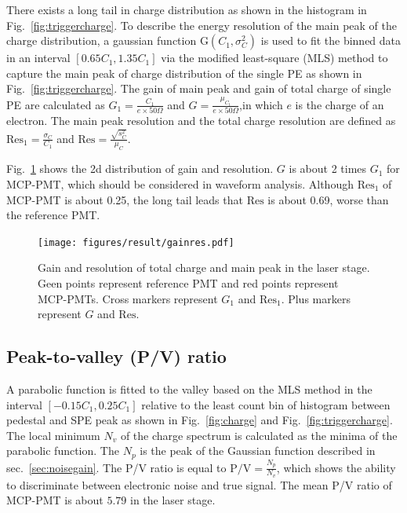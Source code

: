 There exists a long tail in charge distribution as shown in the histogram in Fig.~\ref{fig:triggercharge}. To describe the energy resolution of the main peak of the charge distribution, a gaussian function G$(C_1,\sigma^2_{C})$ is used to fit the binned data in an interval $[0.65C_1, 1.35C_1]$ via the modified least-square (MLS) method \cite{Cowan1998StatisticalDA} to capture the main peak of charge distribution of the single PE as shown in Fig.~\ref{fig:triggercharge}. The gain of main peak and gain of total charge of single PE are calculated as $G_1=\frac{C_1}{e\times 50\Omega}$ and $G= \frac{\mu_{C_t}}{e\times 50\Omega}$,in which $e$ is the charge of an electron. The main peak resolution and the total charge resolution are defined as $\mathrm{Res}_1=\frac{\sigma_{C}}{C_1}$ and $\mathrm{Res}=\frac{\sqrt{s^2_{C}}}{\mu_{C}}$.

Fig.~\ref{fig:totalchargeCompare} shows the 2d distribution of gain and resolution. $G$ is about 2 times $G_1$ for MCP-PMT, which should be considered in waveform analysis. Although $\mathrm{Res}_1$ of MCP-PMT is about 0.25, the long tail leads that $\mathrm{Res}$ is about 0.69, worse than the reference PMT.

\begin{figure}[!htbp]
    \centering
    \texttt{[image: figures/result/gainres.pdf]}
    \caption{Gain and resolution of total charge and main peak in the laser stage. Geen points represent reference PMT and red points represent MCP-PMTs. Cross markers represent $G_1$ and $\mathrm{Res}_1$. Plus markers represent $G$ and $\mathrm{Res}$.}
    \label{fig:totalchargeCompare}
\end{figure}

\subsection{Peak-to-valley (P/V) ratio}
A parabolic function is fitted to the valley based on the MLS method in the interval $[-0.15C_1, 0.25C_1]$ relative to the least count bin of histogram between pedestal and SPE peak as shown in Fig.~\ref{fig:charge} and Fig.~\ref{fig:triggercharge}. The local minimum $N_v$ of the charge spectrum is calculated as the minima of the parabolic function. The $N_p$ is the peak of the Gaussian function described in sec.~\ref{sec:noisegain}. The P/V ratio is equal to $\mathrm{P/V}=\frac{N_p}{N_v}$, which shows the ability to discriminate between electronic noise and true signal. The mean P/V ratio of MCP-PMT is about $5.79$ in the laser stage.

